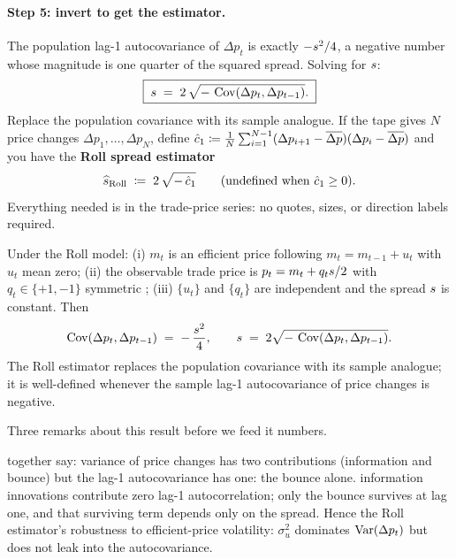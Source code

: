 \paragraph{Step 5: invert to get the estimator.} The population
lag-1 autocovariance of $\Delta p_t$ is exactly $-s^2/4$,
a negative number whose magnitude is one quarter of the squared
spread. Solving for $s$:
\begin{equation}
  \boxed{\;s \;=\; 2 \,\sqrt{-\,\operatorname{Cov}(\Delta p_t, \Delta p_{t-1})}.\;}
  \label{eq:roll_estimator}
\end{equation}
Replace the population covariance with its sample analogue. If the
tape gives $N$ price changes $\Delta p_1, \dots, \Delta p_N$, define
$\hat c_1 \coloneqq \frac{1}{N}\sum_{i=1}^{N-1}
(\Delta p_{i+1} - \overline{\Delta p})(\Delta p_i - \overline{\Delta p})$
and you have the \textbf{Roll spread estimator}
\[
  \widehat{s}_{\mathrm{Roll}}
  \;\coloneqq\; 2 \,\sqrt{-\,\hat c_1}
  \qquad (\text{undefined when } \hat c_1 \geq 0).
\]
Everything needed is in the trade-price series: no quotes, sizes,
or direction labels required.

\begin{keyfactbox}
Under the Roll model: (i) $m_t$ is an efficient price following
$m_t = m_{t-1} + u_t$ with $u_t$ \iid{} mean zero; (ii) the
observable trade price is $p_t = m_t + q_t s/2$ with
$q_t \in \{+1,-1\}$ symmetric \iid; (iii) $\{u_t\}$ and $\{q_t\}$
are independent and the spread $s$ is constant. Then
\[
  \operatorname{Cov}(\Delta p_t, \Delta p_{t-1}) \;=\; -\,\frac{s^2}{4},
  \qquad
  s \;=\; 2 \sqrt{-\,\operatorname{Cov}(\Delta p_t, \Delta p_{t-1})}.
\]
The Roll estimator replaces the population covariance with its
sample analogue; it is well-defined whenever the sample lag-1
autocovariance of price changes is negative.
\end{keyfactbox}

Three remarks about this result before we feed it numbers.

\begin{remark}
 together say: variance of
price changes has two contributions (information and bounce) but
the lag-1 autocovariance has one: the bounce alone. \iid{}
information innovations contribute zero lag-1 autocorrelation;
only the bounce survives at lag one, and that surviving term
depends only on the spread. Hence the Roll estimator's robustness to efficient-price
volatility: $\sigma_u^2$ dominates $\operatorname{Var}(\Delta p_t)$ but does not
leak into the autocovariance.
\end{remark}

